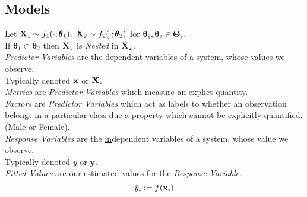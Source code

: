 \documentclass[11pt,a4paper]{article}
\begin{document}
\subsection{Models}

Let $\X_1\sim f_1(\cdot;\pmb\theta_1),\ \X_2\sim f_2(\cdot;\pmb\theta_2)$ for $\pmb\theta_1,\pmb\theta_2\in\pmb\Theta_1$.\\
If $\pmb\theta_1\subset\pmb\theta_2$ then $\textbf{X}_1$ is \textit{Nested} in $\textbf{X}_2$.\\

\textit{Predictor Variables} are the dependent variables of a system, whose values we observe.\\
\nb Typically denoted $\textbf{x}$ or $\textbf{X}$.\\

\textit{Metrics} are \textit{Predictor Variables} which measure an explict quantity.\\

\textit{Factors} are \textit{Predictor Variables} which act as labels to whether an observation belongs in a particular class due a property which cannot be explicitly quantified. (\eg Male or Female).\\

\textit{Response Variables} are the \underline{in}dependent variables of a system, whose value we observe.\\
\nb Typically denoted $y$ or $\textbf{y}$.\\

\textit{Fitted Values} are our estimated values for the \textit{Response Variable}.
$$\hat{y}_i:=f(\textbf{x}_i)$$
\end{document}
